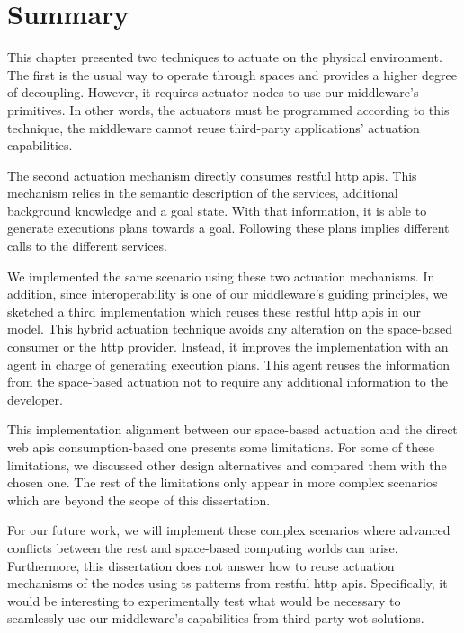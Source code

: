 \section{Summary}
\label{sec:actuation_summary}

This chapter presented two techniques to actuate on the physical environment.
The first is the usual way to operate through spaces and provides a higher degree of decoupling.
However, it requires actuator nodes to use our middleware's primitives. %
In other words, the actuators must be programmed according to this technique, the middleware cannot reuse third-party applications' actuation capabilities.


The second actuation mechanism directly consumes \ac{rest}ful \acs{http} \acsp{api}.
This mechanism relies in the semantic description of the services, additional background knowledge and a goal state. %
With that information, it is able to generate executions plans towards a goal.
Following these plans implies different calls to the different services.


We implemented the same scenario using these two actuation mechanisms.
In addition, since interoperability is one of our middleware's guiding principles, we sketched a third implementation which reuses these \ac{rest}ful \acs{http} \acsp{api} in our \Space{} model.
This hybrid actuation technique avoids any alteration on the space-based consumer or the \ac{http} provider.
Instead, it improves the \Space{} implementation with an agent in charge of generating execution plans.
This agent reuses the information from the space-based actuation not to require any additional information to the developer.


This implementation alignment between our space-based actuation and the direct web \acsp{api} consumption-based one presents some limitations.
For some of these limitations, we discussed other design alternatives and compared them with the chosen one.
The rest of the limitations only appear in more complex scenarios which are beyond the scope of this dissertation.


For our future work, we will implement these complex scenarios where advanced conflicts between the \ac{rest} and space-based computing worlds can arise.
Furthermore, this dissertation does not answer how to reuse actuation mechanisms of the nodes using \ac{ts} patterns from \ac{rest}ful \acs{http} \acsp{api}.
Specifically, it would be interesting to experimentally test what would be necessary to seamlessly use our middleware's capabilities from  third-party \ac{wot} solutions.